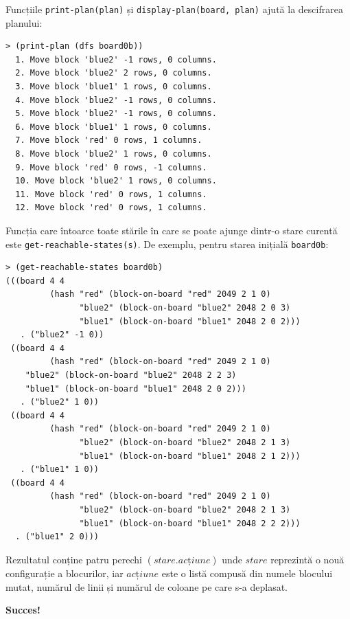 \documentclass[12pt]{article}
\begin{document}
Funcțiile \texttt{print-plan(plan)} și \texttt{display-plan(board,
  plan)} ajută la descifrarea planului:
\begin{verbatim}
> (print-plan (dfs board0b))
  1. Move block 'blue2' -1 rows, 0 columns.
  2. Move block 'blue2' 2 rows, 0 columns.
  3. Move block 'blue1' 1 rows, 0 columns.
  4. Move block 'blue2' -1 rows, 0 columns.
  5. Move block 'blue2' -1 rows, 0 columns.
  6. Move block 'blue1' 1 rows, 0 columns.
  7. Move block 'red' 0 rows, 1 columns.
  8. Move block 'blue2' 1 rows, 0 columns.
  9. Move block 'red' 0 rows, -1 columns.
  10. Move block 'blue2' 1 rows, 0 columns.
  11. Move block 'red' 0 rows, 1 columns.
  12. Move block 'red' 0 rows, 1 columns.
\end{verbatim}

Funcția care întoarce toate stările în care se poate ajunge dintr-o
stare curentă este \texttt{get-reachable-states(s)}. De exemplu,
pentru starea inițială \texttt{board0b}:

\begin{verbatim}
> (get-reachable-states board0b)
(((board 4 4
         (hash "red" (block-on-board "red" 2049 2 1 0)
               "blue2" (block-on-board "blue2" 2048 2 0 3)
               "blue1" (block-on-board "blue1" 2048 2 0 2)))
   . ("blue2" -1 0))
 ((board 4 4
         (hash "red" (block-on-board "red" 2049 2 1 0)
    "blue2" (block-on-board "blue2" 2048 2 2 3)
    "blue1" (block-on-board "blue1" 2048 2 0 2)))
   . ("blue2" 1 0))
 ((board 4 4
         (hash "red" (block-on-board "red" 2049 2 1 0)
               "blue2" (block-on-board "blue2" 2048 2 1 3)
               "blue1" (block-on-board "blue1" 2048 2 1 2)))
   . ("blue1" 1 0))
 ((board 4 4
         (hash "red" (block-on-board "red" 2049 2 1 0)
               "blue2" (block-on-board "blue2" 2048 2 1 3)
               "blue1" (block-on-board "blue1" 2048 2 2 2)))
  . ("blue1" 2 0)))
\end{verbatim}

Rezultatul conține patru perechi $(stare . acțiune)$ unde $stare$
reprezintă o nouă configurație a blocurilor, iar $acțiune$ este o
listă compusă din numele blocului mutat, numărul de linii și numărul
de coloane pe care s-a deplasat.

\textbf{Succes!}
\end{document}
